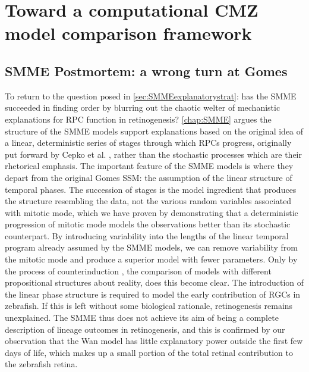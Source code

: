 \chapter{Toward a computational CMZ model comparison framework}
\label{chap:SMMEoutro}
\section{SMME Postmortem: a wrong turn at Gomes}
To return to the question posed in \autoref{sec:SMMEexplanatorystrat}: has the SMME succeeded in finding order by blurring out the chaotic welter of mechanistic explanations for RPC function in retinogenesis? \autoref{chap:SMME} argues the structure of the SMME models support explanations based on the original idea of a linear, deterministic series of stages through which RPCs progress, originally put forward by Cepko et al. \cite{Cepko1996}, rather than the stochastic processes which are their rhetorical emphasis. The important feature of the SMME models is where they depart from the original Gomes SSM: the assumption of the linear structure of temporal phases. The succession of stages is the model ingredient that produces the structure resembling the data, not the various random variables associated with mitotic mode, which we have proven by demonstrating that a deterministic progression of mitotic mode models the observations better than its stochastic counterpart. By introducing variability into the lengths of the linear temporal program already assumed by the SMME models, we can remove variability from the mitotic mode and produce a superior model with fewer parameters. Only by the process of counterinduction \cite{Feyerabend1993}, the comparison of models with different propositional structures about reality, does this become clear. The introduction of the linear phase structure is required to model the early contribution of RGCs in zebrafish. If this is left without some biological rationale, retinogenesis remains unexplained. The SMME thus does not achieve its aim of being a complete description of lineage outcomes in retinogenesis, and this is confirmed by our observation that the Wan model \cite{Wan2016} has little explanatory power outside the first few days of life, which makes up a small portion of the total retinal contribution to the zebrafish retina.

